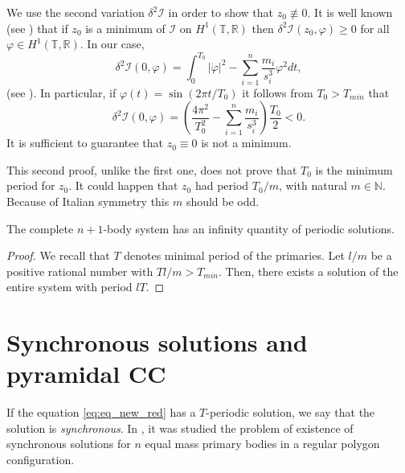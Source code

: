 \documentclass[smallcondensed]{svjour3}
\newcommand{\rr}{\mathbb{R}}
\begin{document}
\begin{remark}
We use the second variation $\delta^2 \mathcal{I}$ in order to show  that $z_0\nequiv 0$. It is well known (see \cite[Th. 1.3.1]{jost1998calculus}) that if $z_0$ is a minimum of $\mathcal{I}$ on $H^1(\mathbb{T},\rr)$  then $\delta^2 \mathcal{I} (z_0,\varphi)\geq 0$ for all $\varphi\in H^1(\mathbb{T},\rr)$. In our case,
\[\delta^2\mathcal{I}(0,\varphi)=\int_0^{T_0} |\dot{\varphi}|^2-\sum_{i=1}^{n}\frac{m_i}{s_i^3}\varphi^2 dt,\]
(see \cite[Eq. 1.3.6]{jost1998calculus}). In particular, if $\varphi(t)=\sin (2\pi t/T_0)$ it follows from $T_0>T_{min}$  that
\begin{equation}\label{eq:form.delta2}
 \delta^2 \mathcal{I} (0,\varphi)=\left( \frac{4\pi^2}{T_0^2}-\sum_{i=1}^{n}\frac{m_i}{s_i^3} \right)\frac{T_0}{2}<0.
\end{equation}
It is sufficient  to guarantee that $z_0\equiv 0$ is not a minimum.


This second proof, unlike the first one, does not prove that $T_0$ is the minimum period for $z_0$. It could happen that $z_0$ had period $T_0/m$, with natural $m\in\mathbb{N}$. Because of Italian symmetry this $m$ should be odd.
\end{remark}






\begin{corollary}\label{cor:sol.periodica.sist.completo}
The complete $n+1$-body system has an infinity quantity of periodic solutions.
\end{corollary}
\begin{proof} We recall that $T$ denotes minimal period of the primaries.
Let $l/m$  be a positive rational number with $Tl/m>T_{min}$. Then, there exists a solution of the entire system with period $lT$.
\end{proof}





\section{Synchronous solutions and pyramidal CC}\label{sec:sincro}



If the equation \eqref{eq:eq_new_red} has a $T$-periodic solution,  we say that the solution is \emph{synchronous}. In \cite{li2013characterization}, it was studied the problem of existence of synchronous solutions for $n$ equal mass primary bodies in a regular polygon configuration.
\end{document}
